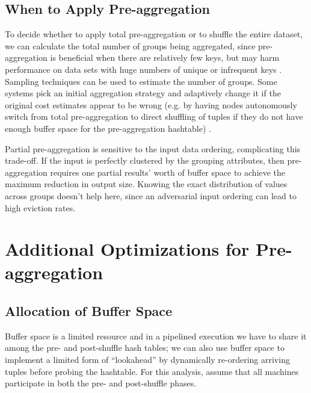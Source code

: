 \documentclass[12pt]{article}
\begin{document}
\subsection{When to Apply Pre-aggregation}

To decide whether to apply total pre-aggregation or to shuffle the entire
dataset, we can calculate the total number of groups being aggregated, since
pre-aggregation is beneficial when there are relatively few keys, but may harm
performance on data sets with huge numbers of unique or infrequent keys
\cite{adaptive-aggregation}.
Sampling techniques can be used to estimate the number of groups.
Some systems pick an initial aggregation strategy and adaptively change it if
the original cost estimates appear to be wrong (e.g. by having nodes
autonomously switch from total pre-aggregation to direct shuffling of tuples
if they do not have enough buffer space for the pre-aggregation hashtable)
\cite{adaptive-aggregation}.

Partial pre-aggregation is sensitive to the input data ordering, complicating
this trade-off.  If the input is perfectly clustered by the grouping
attributes, then pre-aggregation requires one partial results' worth of buffer
space to achieve the maximum reduction in output size.  Knowing the exact
distribution of values across groups doesn't help here, since an adversarial
input ordering can lead to high eviction rates.

\section{Additional Optimizations for Pre-aggregation}

\subsection{Allocation of Buffer Space}
Buffer space is a limited resource and in a pipelined execution we have to share it among the pre- and post-shuffle hash tables; we can also use buffer space to implement a limited form of ``lookahead'' by dynamically re-ordering arriving tuples before probing the hashtable.  For this analysis, assume that all machines participate in both the pre- and post-shuffle phases.

\end{document}
